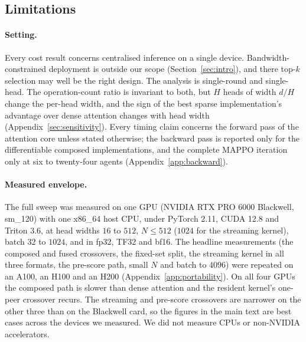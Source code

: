 \subsection{Limitations}
\label{sec:limits}

\paragraph{Setting.} Every cost result concerns centralised inference on a
single device. Bandwidth-constrained deployment is outside our scope
(Section~\ref{sec:intro}), and there top-$k$ selection may well be the right
design. The analysis is single-round
and single-head. The operation-count ratio is invariant to both, but $H$ heads
of width $d/H$ change the per-head width, and the sign of the best sparse
implementation's advantage over dense attention changes with head width
(Appendix~\ref{sec:sensitivity}). Every timing claim concerns the forward pass
of the attention core unless stated otherwise; the backward pass is reported
only for the differentiable composed implementations, and the complete MAPPO
iteration only at six to twenty-four agents (Appendix~\ref{app:backward}).

\paragraph{Measured envelope.} The full sweep was measured on one GPU (NVIDIA
RTX PRO 6000 Blackwell, sm\_120) with one x86\_64 host CPU, under PyTorch 2.11,
CUDA 12.8 and Triton 3.6, at head widths $16$ to $512$, $N \le 512$ ($1024$ for
the streaming kernel), batch $32$ to $1024$, and in fp32, TF32 and bf16. The
headline measurements (the composed and fused crossovers, the fixed-set split,
the streaming kernel in all three formats, the pre-score path, small $N$ and
batch to $4096$) were repeated on an A100, an H100 and an H200
(Appendix~\ref{app:portability}). On all four GPUs the composed path is slower
than dense attention and the resident kernel's one-peer crossover recurs. The
streaming and pre-score crossovers are narrower on the other three than on the
Blackwell card, so the figures in the main text are best cases across the
devices we measured. We did not measure CPUs or non-NVIDIA accelerators.

